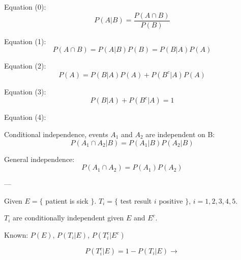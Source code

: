 \documentclass{report}
\begin{document}
Equation (0): $$P(A|B) = \frac{P(A \cap B)}{P(B)}$$ 

Equation (1): $$P(A \cap B) = P(A|B) P(B) = P(B|A) P(A)$$

Equation (2): $$P(A) = P(B|A) P(A) + P(B^c|A) P(A) $$

Equation (3): $$ P(B|A) +P(B^c|A) = 1 $$

Equation (4): 

Conditional independence, events $A_1$ and $A_2$ are independent on B: $$ P(A_1 \cap A_2 | B) = P(A_1 | B) P(A_2 |B) $$

General independence: $$P(A_1 \cap A_2) = P(A_1) P(A_2)$$

---

Given $E = \{$ patient is sick $\}$. $T_i = \{$ test result $i$ positive $\}$, $i=1,2,3,4,5$.

$T_i$ are conditionally independent given $E$ and $E^c$.

Known: $P(E)$, $P(T_i|E)$, $P(T_i^c|E^c)$

$$P(T_i^c|E) = 1-P(T_i|E) \rightarrow $$
\end{document}

